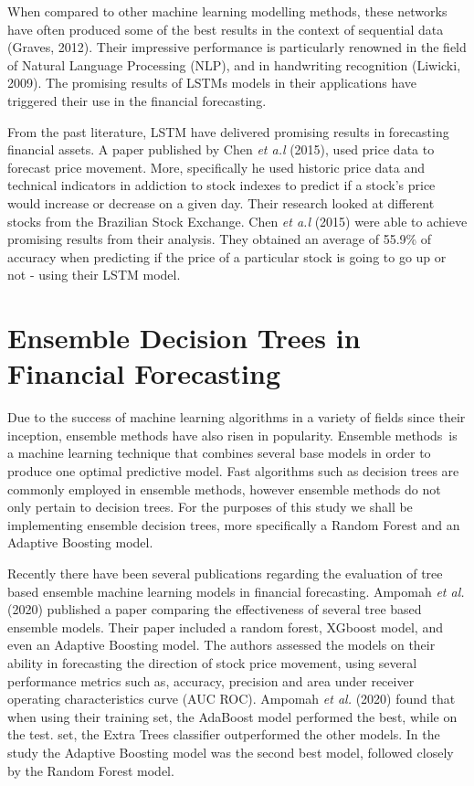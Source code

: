 When compared to other machine learning modelling methods, these networks have often produced some of the best results in the context of sequential data (Graves, 2012). Their impressive performance is particularly renowned in the field of Natural Language Processing (NLP), and in handwriting recognition (Liwicki, 2009). The promising results of LSTMs models in their applications have triggered their use in the financial forecasting. 

From the past literature, LSTM have delivered promising results in forecasting financial assets. A paper published by Chen \textit{et a.l} (2015), used price data to forecast price movement. More, specifically he used historic price data and technical indicators in addiction to stock indexes to predict if a stock’s price would increase or decrease on a given day. Their research looked at different stocks from the Brazilian Stock Exchange. Chen \textit{et a.l} (2015) were able to achieve promising results from their analysis. They obtained an average of 55.9\% of accuracy when predicting if the price of a particular stock is going to go up or not - using their LSTM model. 



\section{Ensemble Decision Trees in Financial Forecasting}

Due to the success of machine learning algorithms in a variety of fields since their inception, ensemble methods have also risen in popularity. Ensemble methods is a machine learning technique that combines several base models in order to produce one optimal predictive model. Fast algorithms such as decision trees are commonly employed in ensemble methods, however ensemble methods do not only pertain to decision trees.  For the purposes of this study we shall be implementing ensemble decision trees, more specifically a Random Forest and an Adaptive Boosting model. 

Recently there have been several publications regarding the evaluation of tree based ensemble machine learning models in financial forecasting. Ampomah \textit{et al.} (2020) published a paper comparing the effectiveness of several tree based ensemble models. Their paper included a random forest, XGboost model, and even an Adaptive Boosting model. The authors assessed the models on their ability in forecasting the direction of stock price movement, using several performance metrics such as, accuracy, precision and area under receiver operating characteristics curve (AUC ROC). Ampomah \textit{et al.} (2020) found that when using their training set, the AdaBoost model performed the best, while on the test. set, the Extra Trees classifier outperformed the other models. In the study the Adaptive Boosting model was the second best model, followed closely by the Random Forest model.

